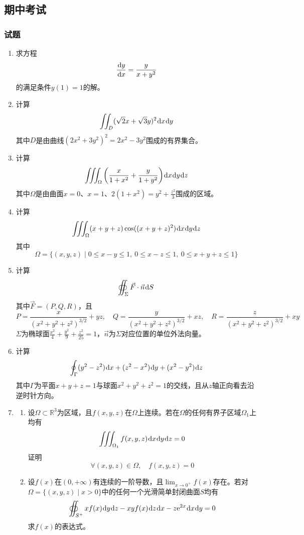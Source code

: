 \documentclass[a4paper,UTF8,fontset=windows,AutoFakeBold]{ctexart}
\newcommand*{\dr}{\hspace{0.07em}\mathrm{d}}
\newcommand*{\er}{\mathrm{e}}
\newcommand*{\Fv}{\vec{F}}
\newcommand*{\nv}{\vec{n}}
\newcommand*{\rb}{\mathbb{R}}
\theoremstyle{ex}
\begin{document}
\subsection{期中考试}
\subsubsection{试题}
\begin{enumerate}
    \item 求方程
    $$\frac{\dr y}{\dr x}=\frac{y}{x+y^2}$$
    的满足条件$y(1)=1$的解。

    \item 计算
    $$\iint_D(\sqrt2x+\sqrt3y)^2\dr x\dr y$$
    其中$D$是由曲线$(2x^2+3y^2)^2=2x^2-3y^2$围成的有界集合。

    \item 计算
    $$\iiint_\Omega\bigg(\frac{x}{1+x^2}+\frac{y}{1+y^2}\bigg)\dr x\dr y\dr z$$
    其中$\Omega$是由曲面$x=0$、$x=1$、$2(1+x^2)=y^2+\frac{z^2}{3}$围成的区域。

    \item 计算
    $$\iiint_\Omega(x+y+z)\cos((x+y+z)^2)\dr x\dr y\dr z$$
    其中
    $$\Omega=\big\{(x,y,z)\mid0\le x-y\le1,\ 0\le x-z\le1,\ 0\le x+y+z\le1\big\}$$

    \item 计算
    $$\oiint_\Sigma\Fv\cdot\nv\dr S$$
    其中$\Fv=(P,Q,R)$，且
    $$P=\frac{x}{(x^2+y^2+z^2)^{3/2}}+yz,\quad Q=\frac{y}{(x^2+y^2+z^2)^{3/2}}+xz,\quad R=\frac{z}{(x^2+y^2+z^2)^{3/2}}+xy$$
    $\Sigma$为椭球面$\frac{x^2}{4}+\frac{y^2}{9}+\frac{z^2}{25}=1$，$\nv$为$\Sigma$对应位置的单位外法向量。

    \item 计算
    $$\oint_\Gamma(y^2-z^2)\dr x+(z^2-x^2)\dr y+(x^2-y^2)\dr z$$
    其中$\Gamma$为平面$x+y+z=1$与球面$x^2+y^2+z^2=1$的交线，且从$z$轴正向看去沿逆时针方向。

    \item
    \begin{enumerate}[(1)]
        \item 设$\Omega\subset\rb^3$为区域，且$f(x,y,z)$在$\Omega$上连续。若在$\Omega$的任何有界子区域$\Omega_1$上均有
        $$\iiint_{\Omega_1}f(x,y,z)\dr x\dr y\dr z=0$$
        证明
        $$\forall(x,y,z)\in\Omega,\quad f(x,y,z)=0$$

        \item 设$f(x)$在$(0,+\infty)$有连续的一阶导数，且$\lim_{x\to0^+}f(x)$存在。若对$\Omega=\{(x,y,z)\mid x>0\}$中的任何一个光滑简单封闭曲面$S$均有
        $$\oiint_{S^+}xf(x)\dr y\dr z-xyf(x)\dr z\dr x-z\er^{2x}\dr x\dr y=0$$
        求$f(x)$的表达式。
    \end{enumerate}
\end{enumerate}
\end{document}
